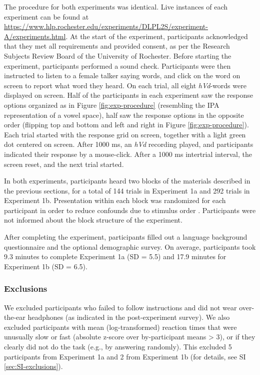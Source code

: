 \documentclass[preprint]{JASA}
\begin{document}
The procedure for both experiments was identical. Live instances of each experiment can be found at \url{https://www.hlp.rochester.edu/experiments/DLPL2S/experiment-A/experiments.html}. At the start of the experiment, participants acknowledged that they met all requirements and provided consent, as per the Research Subjects Review Board of the University of Rochester. Before starting the experiment, participants performed a sound check. Participants were then instructed to listen to a female talker saying words, and click on the word on screen to report what word they heard. On each trial, all eight \emph{hVd}-words were displayed on screen. Half of the participants in each experiment saw the response options organized as in Figure \ref{fig:exp-procedure} (resembling the IPA representation of a vowel space), half saw the response options in the opposite order (flipping top and bottom and left and right in Figure \ref{fig:exp-procedure}). Each trial started with the response grid on screen, together with a light green dot centered on screen. After 1000 ms, an \emph{hVd} recording played, and participants indicated their response by a mouse-click. After a 1000 ms intertrial interval, the screen reset, and the next trial started.

In both experiments, participants heard two blocks of the materials described in the previous sections, for a total of 144 trials in Experiment 1a and 292 trials in Experiment 1b. Presentation within each block was randomized for each participant in order to reduce confounds due to stimulus order \citep[known to affect vowel perception,][ and references therein]{repp-crowder1990}. Participants were not informed about the block structure of the experiment.

After completing the experiment, participants filled out a language background questionnaire and the optional demographic survey. On average, participants took 9.3 minutes to complete Experiment 1a (SD = 5.5) and 17.9 minutes for Experiment 1b (SD = 6.5).

\subsubsection{Exclusions}\label{exclusions}

We excluded participants who failed to follow instructions and did not wear over-the-ear headphones (as indicated in the post-experiment survey). We also excluded participants with mean (log-transformed) reaction times that were unusually slow or fast (absolute z-score over by-participant means \textgreater{} 3), or if they clearly did not do the task (e.g., by answering randomly). This excluded 5 participants from Experiment 1a and 2 from Experiment 1b (for details, see SI \ref{sec:SI-exclusions}).
\end{document}
